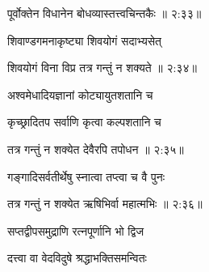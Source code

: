 {\devanagarifont पूर्वोक्तेन विधानेन बोधव्यास्तत्त्वचिन्तकैः {॥ २:३३॥} \veg\dontdisplaylinenum }%

{\devanagarifont शिवाण्डगमनाकृष्ट्या शिवयोगं सदाभ्यसेत् \thinspace{\dandab} \dontdisplaylinenum }%


{\devanagarifont शिवयोगं विना विप्र तत्र गन्तुं न शक्यते {॥ २:३४॥} \veg\dontdisplaylinenum }%

{\devanagarifont अश्वमेधादियज्ञानां कोट्यायुतशतानि च \thinspace{\dandab} \dontdisplaylinenum }%
 
{\devanagarifont कृच्छ्रादितप सर्वाणि कृत्वा कल्पशतानि च  \danda\dontdisplaylinenum }%


{\devanagarifont तत्र गन्तुं न शक्येत देवैरपि तपोधन {॥ २:३५॥} \veg\dontdisplaylinenum }%

{\devanagarifont गङ्गादिसर्वतीर्थेषु स्नात्वा तप्त्वा च वै पुनः \thinspace{\dandab} \dontdisplaylinenum }%
 

{\devanagarifont तत्र गन्तुं न शक्येत ऋषिभिर्वा महात्मभिः {॥ २:३६॥} \veg\dontdisplaylinenum }%

{\devanagarifont सप्तद्वीपसमुद्राणि रत्नपूर्णानि भो द्विज \thinspace{\dandab} \dontdisplaylinenum }%

{\devanagarifont दत्त्वा वा वेदविदुषे श्रद्धाभक्तिसमन्वितः  \danda\dontdisplaylinenum }%
 
